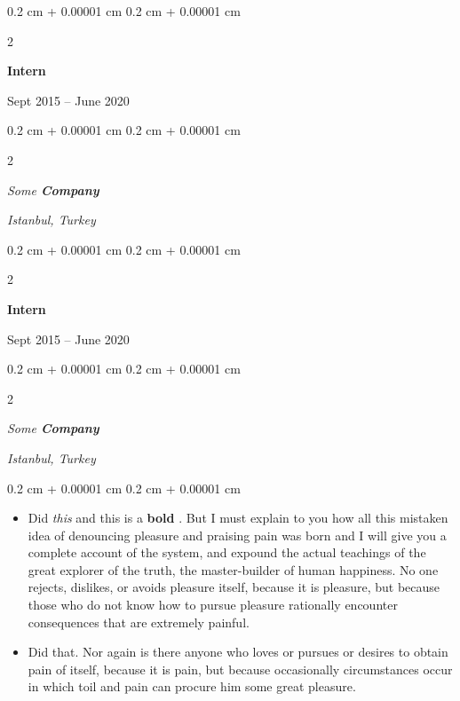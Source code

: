 \documentclass[10pt, letterpaper]{article}
\newenvironment{highlights}{
    \begin{itemize}[
        topsep=0.10 cm,
        parsep=0.10 cm,
        partopsep=0pt,
        itemsep=0pt,
        leftmargin=0.4 cm + 10pt
    ]
}{
    \end{itemize}
} %
\newenvironment{onecolentry}{
    \begin{adjustwidth}{
        0.2 cm + 0.00001 cm
    }{
        0.2 cm + 0.00001 cm
    }
}{
    \end{adjustwidth}
} %
\newenvironment{twocolentry}[2][]{
    \onecolentry
    \def\secondColumn{#2}
    \setcolumnwidth{\fill, 4.5 cm}
    \begin{paracol}{2}
}{
    \switchcolumn \raggedleft \secondColumn
    \end{paracol}
    \endonecolentry
} %
\let\hrefWithoutArrow\href
\renewcommand{\href}[2]{\hrefWithoutArrow{#1}{\ifthenelse{\equal{#2}{}}{ }{#2 }\raisebox{.15ex}{\footnotesize \faExternalLink*}}}
\begin{document}
                \begin{twocolentry}{
                    Sept 2015 – June 2020
                }
                \textbf{Intern}
                \end{twocolentry}
            \begin{twocolentry}{
        \textit{Istanbul, Turkey}    }
            \textit{Some \textbf{Company}}
            \end{twocolentry}



        \vspace{0.2 cm}

                \begin{twocolentry}{
                    Sept 2015 – June 2020
                }
                \textbf{Intern}
                \end{twocolentry}
            \begin{twocolentry}{
        \textit{Istanbul, Turkey}    }
            \textit{Some \textbf{Company}}
            \end{twocolentry}

        \vspace{0.10 cm}
        \begin{onecolentry}
            \begin{highlights}
                \item Did \textit{this} and this is a \textbf{bold} \href{https://example.com}{link}. But I must explain to you how all this mistaken idea of denouncing pleasure and praising pain was born and I will give you a complete account of the system, and expound the actual teachings of the great explorer of the truth, the master-builder of human happiness. No one rejects, dislikes, or avoids pleasure itself, because it is pleasure, but because those who do not know how to pursue pleasure rationally encounter consequences that are extremely painful.
                \item Did that. Nor again is there anyone who loves or pursues or desires to obtain pain of itself, because it is pain, but because occasionally circumstances occur in which toil and pain can procure him some great pleasure.
            \end{highlights}
        \end{onecolentry}
\end{document}
